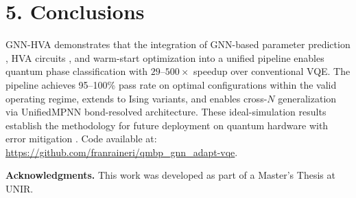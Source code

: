 \documentclass[11pt,a4paper,spanish]{book}
\begin{document}
\section*{5. Conclusions}

GNN-HVA demonstrates that the integration of GNN-based parameter prediction \citep{miao2024, zhang2025}, HVA circuits \citep{wiersema2020}, and warm-start optimization \citep{puig2025} into a unified pipeline enables quantum phase classification with $29$--$500\times$ speedup over conventional VQE. The pipeline achieves 95--100\% pass rate on optimal configurations within the valid operating regime, extends to Ising variants, and enables cross-$N$ generalization via UnifiedMPNN bond-resolved architecture. These ideal-simulation results establish the methodology for future deployment on quantum hardware with error mitigation \citep{kim2023}. Code available at: \url{https://github.com/franraineri/qmbp_gnn_adapt-vqe}.

\vspace{0.3cm}
\noindent\textbf{Acknowledgments.} This work was developed as part of a Master's Thesis at UNIR.
\end{document}
